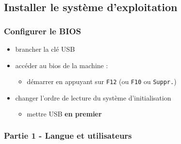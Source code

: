\documentclass[11pt]{article}
\providecommand{\tightlist}{%
      \setlength{\itemsep}{0pt}\setlength{\parskip}{0pt}}
\begin{document}
    \hypertarget{installer-le-systuxe8me-dexploitation}{%
\subsection{Installer le système
d'exploitation}\label{installer-le-systuxe8me-dexploitation}}

    \hypertarget{configurer-le-bios}{%
\subsubsection{Configurer le BIOS}\label{configurer-le-bios}}

\begin{itemize}
\tightlist
\item
  brancher la clé USB
\item
  accéder au bios de la machine :

  \begin{itemize}
  \tightlist
  \item
    démarrer en appuyant sur \texttt{F12} (ou \texttt{F10} ou
    \texttt{Suppr.})
  \end{itemize}
\item
  changer l'ordre de lecture du système d'initialisation

  \begin{itemize}
  \tightlist
  \item
    mettre USB \textbf{en premier}
  \end{itemize}
\end{itemize}

    \hypertarget{partie-1---langue-et-utilisateurs}{%
\subsubsection{Partie 1 - Langue et
utilisateurs}\label{partie-1---langue-et-utilisateurs}}
\end{document}
